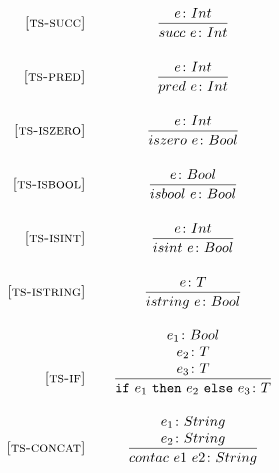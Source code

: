 \documentclass[addpoints]{exam}
\begin{document}
\[
  \begin{array}{r@{\qquad}c}
    \ssrule{ts-succ}{
        \tstep{e}{Int}
    }{
        \tstep{succ~e}{Int}
    }
    \ssrule{ts-pred}{
        \tstep{e}{Int}
    }{
        \tstep{pred~e}{Int}
    }
    \ssrule{ts-iszero}{
        \tstep{e}{Int}
    }{
        \tstep{iszero~e}{Bool}
    }
    \ssrule{ts-isbool}{
        \tstep{e}{Bool}
    }{
        \tstep{isbool~e}{Bool}
    }
    \ssrule{ts-isint}{
        \tstep{e}{Int}
    }{
        \tstep{isint~e}{Bool}
    }
    \ssrule{ts-istring}{
        \tstep{e}{T}
    }{
        \tstep{istring~e}{Bool}
    }
    \ssrule{ts-if}{
        \tstep{e_1}{Bool} \\
        \tstep{e_2}{T} \\
        \tstep{e_3}{T}
    }{
        \tstep{\ife{e_1}{e_2}{e_3}}{T}
    }
    \ssrule{ts-concat}{
        \tstep{e_1}{String} \\
        \tstep{e_2}{String}
    }{
        \tstep{contac~e1~e2}{String}
    }
    
  \end{array}
\]
\end{document}
